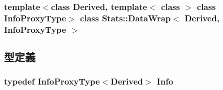 \subsubsection*{template$<$class Derived, template$<$ class $>$ class InfoProxyType$>$ class Stats::DataWrap$<$ Derived, InfoProxyType $>$}



\subsection{型定義}
\hypertarget{classStats_1_1DataWrap_a76d2c248839f34168d2a3760bc1fbdb9}{
\subsubsection[{Info}]{\setlength{\rightskip}{0pt plus 5cm}typedef InfoProxyType$<$Derived$>$ {\bf Info}}}
\label{classStats_1_1DataWrap_a76d2c248839f34168d2a3760bc1fbdb9}


